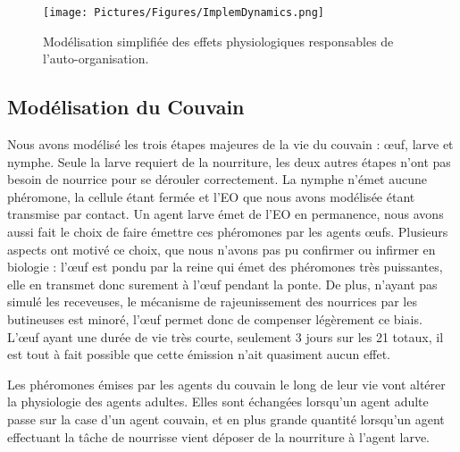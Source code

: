 			
			\begin{figure}
			\centering
			\texttt{[image: Pictures/Figures/ImplemDynamics.png]}
			\caption[Notre modélisation de la physiologie de l'abeille adulte.]{Modélisation simplifiée des effets physiologiques responsables de l'auto-organisation.}
			\label{HJEODynamics}
			\end{figure}
		
		
		\subsection{Modélisation du Couvain}
		
			Nous avons modélisé les trois étapes majeures de la vie du couvain : œuf, larve et nymphe. Seule la larve requiert de la nourriture, les deux autres étapes n'ont pas besoin de nourrice pour se dérouler correctement. La nymphe n'émet aucune phéromone, la cellule étant fermée et l'EO que nous avons modélisée étant transmise par contact. Un agent larve émet de l'EO en permanence, nous avons aussi fait le choix de faire émettre ces phéromones par les agents œufs. Plusieurs aspects ont motivé ce choix, que nous n'avons pas pu confirmer ou infirmer en biologie : l'œuf est pondu par la reine qui émet des phéromones très puissantes, elle en transmet donc surement à l'œuf pendant la ponte. De plus, n'ayant pas simulé les receveuses, le mécanisme de rajeunissement des nourrices par les butineuses est minoré, l'œuf permet donc de compenser légèrement ce biais. L'œuf ayant une durée de vie très courte, seulement 3 jours sur les 21 totaux, il est tout à fait possible que cette émission n'ait quasiment aucun effet.
			
			Les phéromones émises par les agents du couvain le long de leur vie vont altérer la physiologie des agents adultes. Elles sont échangées lorsqu'un agent adulte passe sur la case d'un agent couvain, et en plus grande quantité lorsqu'un agent effectuant la tâche de nourrisse vient déposer de la nourriture à l'agent larve.
		
